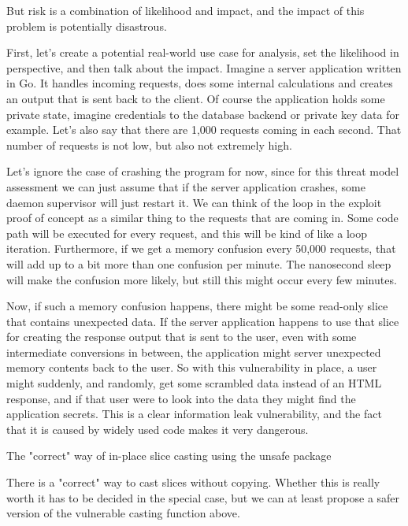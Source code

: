         But risk is a combination of likelihood and impact, and the impact of this problem is potentially disastrous.

        First, let's create a potential real-world use case for analysis, set the likelihood in perspective, and then talk
        about the impact. Imagine a server application written in Go. It handles incoming requests, does some internal
        calculations and creates an output that is sent back to the client. Of course the application holds some private state,
        imagine credentials to the database backend or private key data for example. Let's also say that there are 1,000
        requests coming in each second. That number of requests is not low, but also not extremely high.

        Let's ignore the case of crashing the program for now, since for this threat model assessment we can just assume that
        if the server application crashes, some daemon supervisor will just restart it. We can think of the loop in the exploit
        proof of concept as a similar thing to the requests that are coming in. Some code path will be executed for every
        request, and this will be kind of like a loop iteration. Furthermore, if we get a memory confusion every 50,000 requests,
        that will add up to a bit more than one confusion per minute. The nanosecond sleep will make the confusion more likely,
        but still this might occur every few minutes.

        Now, if such a memory confusion happens, there might be some read-only slice that contains unexpected data. If the
        server application happens to use that slice for creating the response output that is sent to the user, even with some
        intermediate conversions in between, the application might server unexpected memory contents back to the user. So with
        this vulnerability in place, a user might suddenly, and randomly, get some scrambled data instead of an HTML response,
        and if that user were to look into the data they might find the application secrets. This is a clear information leak
        vulnerability, and the fact that it is caused by widely used code makes it very dangerous.


        The "correct" way of in-place slice casting using the unsafe package

        There is a "correct" way to cast slices without copying. Whether this is really worth it has to be decided in the
        special case, but we can at least propose a safer version of the vulnerable casting function above.

